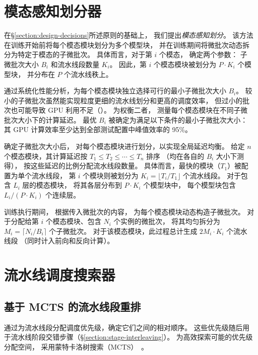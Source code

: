 \section{模态感知划分器}
\label{section:modality-aware-partitioning}

在\S\ref{section:design-decisions}所述原则的基础上，
我们提出\emph{模态感知划分}。
该方法在训练开始前将每个模态模块划分为多个模型块，
并在训练期间将微批次动态拆分为特定于模态的子微批次。
具体而言，对于第 $i$ 个模态，{\sys} 确定两个参数：
子微批次大小 $B_i$ 和流水线段数量 $K_i$。
因此，第 $i$ 个模态模块被划分为 $P \cdot K_i$ 个模型块，
并分布在 $P$ 个流水线秩上。

\sys{} 通过系统化性能分析，为每个模态模块独立选择可行的最小子微批次大小 $B_i$。
较小的子微批次虽然能实现粒度更细的流水线划分和更高的调度效率，
但过小的批次也可能导致 GPU 利用不足（）。
为权衡二者，\sys{} 测量每个模态模块在不同子微批次大小下的计算延迟。
最优 $B_i$ 被确定为满足以下条件的最小子微批次大小：
其 GPU 计算效率至少达到全部测试配置中峰值效率的 95\%。

确定子微批次大小后，\sys{} 对每个模态模块进行划分，以实现全局延迟均衡。
给定 $n$ 个模态模块，其计算延迟按 $T_1 \leq T_2 \leq \cdots \leq T_n$ 排序
（均在各自的 $B_i$ 大小下测得），
\sys{} 按这些延迟的比例分配流水线段数量。
具体而言，最快的模块（$T_1$）被配置为单个流水线段，
第 $i$ 个模块则被划分为 $K_i = \lfloor T_i / T_1 \rfloor$ 个流水线段。
对于包含 $L_i$ 层的模态模块，
\sys{} 将其各层分布到 $P \cdot K_i$ 个模型块中，
每个模型块包含 $L_i/(P \cdot K_i)$ 个连续层。

训练执行期间，\sys{} 根据传入微批次的内容，
为每个模态模块动态构造子微批次。
对于分配给第 $i$ 个模态模块、包含 $N_i$ 个实例的微批次，
\sys{} 将其均匀拆分为 $M_i = \lceil N_i/B_i \rceil$ 个子微批次。
对于该模态模块，此过程总计生成 $2 M_i \cdot K_i$ 个流水线段
（同时计入前向和反向计算）。

\section{流水线调度搜索器}
\label{section:pipeline-schedule-searcher}

\subsection{基于 MCTS 的流水线段重排}
\label{section:segment-reordering}

\sys{} 通过为流水线段分配调度优先级，确定它们之间的相对顺序。
这些优先级随后用于流水线阶段交错步骤（\S\ref{section:stage-interleaving}）。
为高效探索可能的优先级分配空间，\sys{} 采用蒙特卡洛树搜索（MCTS）~\cite{mcts}。

